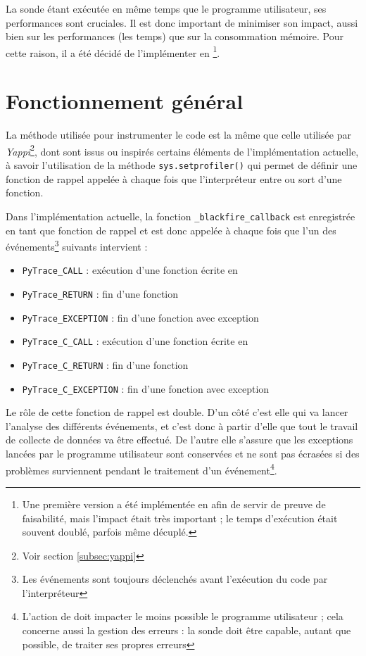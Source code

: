 La sonde étant exécutée en même temps que le programme utilisateur, ses performances sont cruciales. Il est donc important de minimiser son impact, aussi bien sur les performances (les temps) que sur la consommation mémoire. Pour cette raison, il a été décidé de l'implémenter en \C\footnote{Une première version a été implémentée en \Python afin de servir de preuve de faisabilité, mais l'impact était très important ; le temps d'exécution était souvent doublé, parfois même décuplé.}.

  \section{Fonctionnement général}
La méthode utilisée pour instrumenter le code \Python est la même que celle utilisée par \emph{Yappi}\footnote{Voir section \vref{subsec:yappi}}, dont sont issus ou inspirés certains éléments de l'implémentation actuelle, à savoir l'utilisation de la méthode \verb|sys.setprofiler()| qui permet de définir une fonction de rappel appelée à chaque fois que l'interpréteur entre ou sort d'une fonction.

Dans l'implémentation actuelle, la fonction \C \verb|_blackfire_callback| est enregistrée en tant que fonction de rappel et est donc appelée à chaque fois que l'un des événements\footnote{Les événements sont toujours déclenchés avant l'exécution du code par l'interpréteur} suivants intervient :
\begin{itemize}
\item \verb|PyTrace_CALL| : exécution d'une fonction écrite en \Python
\item \verb|PyTrace_RETURN| : fin d'une fonction \Python
\item \verb|PyTrace_EXCEPTION| : fin d'une fonction \Python avec exception
\item \verb|PyTrace_C_CALL| : exécution d'une fonction écrite en \C
\item \verb|PyTrace_C_RETURN| : fin d'une fonction \C
\item \verb|PyTrace_C_EXCEPTION| : fin d'une fonction \C avec exception
\end{itemize}

Le rôle de cette fonction de rappel est double. D'un côté c'est elle qui va lancer l'analyse des différents événements, et c'est donc à partir d'elle que tout le travail de collecte de données va être effectué. De l'autre elle s'assure que les exceptions lancées par le programme utilisateur sont conservées et ne sont pas écrasées si des problèmes surviennent pendant le traitement d'un événement\footnote{L'action de \Blackfire doit impacter le moins possible le programme utilisateur ; cela concerne aussi la gestion des erreurs : la sonde doit être capable, autant que possible, de traiter ses propres erreurs}.

